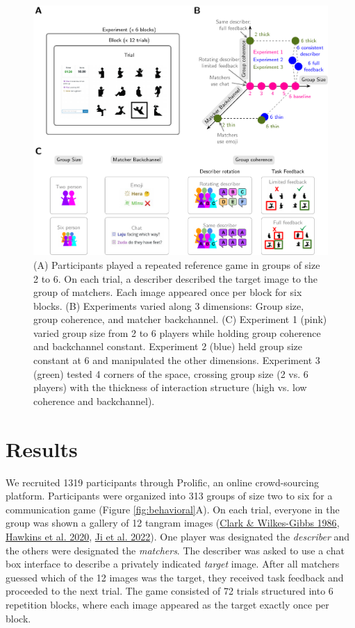 \documentclass[
  english,
]{article}
\begin{document}
\begin{figure}[t!]

{\centering \includegraphics[width=1\linewidth]{expt-diagram3} 

}

\caption{(A) Participants played a repeated reference game in groups of size 2 to 6. On each trial, a describer described the target image to the group of matchers. Each image appeared once per block for six blocks. (B) Experiments varied along 3 dimensions: Group size, group coherence, and matcher backchannel. (C) Experiment 1 (pink) varied group size from 2 to 6 players while holding group coherence and backchannel constant. Experiment 2 (blue) held group size constant at 6 and manipulated the other dimensions. Experiment 3 (green) tested 4 corners of the space, crossing group size (2 vs. 6 players) with the thickness of interaction structure (high vs. low coherence and backchannel).}\label{fig:diagram}
\end{figure}

\hypertarget{results}{%
\section{Results}\label{results}}

We recruited 1319 participants through Prolific, an online crowd-sourcing platform.
Participants were organized into 313 groups of size two to six for a communication game (Figure \ref{fig:behavioral}A).
On each trial, everyone in the group was shown a gallery of 12 tangram images (\protect\hyperlink{ref-clark1986}{Clark \& Wilkes-Gibbs 1986}, \protect\hyperlink{ref-hawkins2020}{Hawkins et al. 2020}, \protect\hyperlink{ref-ji2022abstract}{Ji et al. 2022}).
One player was designated the \emph{describer} and the others were designated the \emph{matchers}.
The describer was asked to use a chat box interface to describe a privately indicated \emph{target} image.
After all matchers guessed which of the 12 images was the target, they received task feedback and proceeded to the next trial.
The game consisted of 72 trials structured into 6 repetition blocks, where each image appeared as the target exactly once per block.
\end{document}
